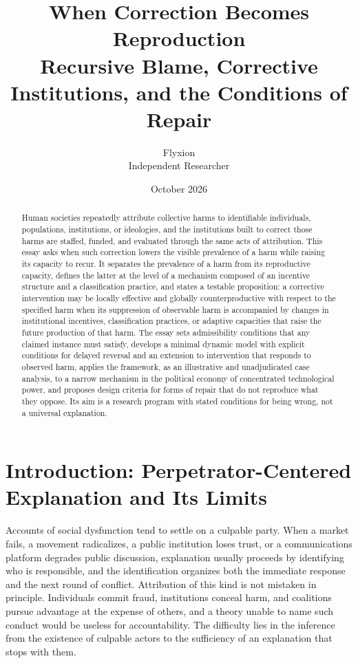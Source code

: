 \documentclass[12pt]{article}
\title{When Correction Becomes Reproduction\\[0.5ex]
\large Recursive Blame, Corrective Institutions, and the Conditions of Repair}
\author{Flyxion\\Independent Researcher}
\date{October 2026}
\theoremstyle{remark}
\begin{document}
\maketitle

\begin{abstract}
Human societies repeatedly attribute collective harms to identifiable individuals, populations, institutions, or ideologies, and the institutions built to correct those harms are staffed, funded, and evaluated through the same acts of attribution. This essay asks when such correction lowers the visible prevalence of a harm while raising its capacity to recur. It separates the prevalence of a harm from its reproductive capacity, defines the latter at the level of a mechanism composed of an incentive structure and a classification practice, and states a testable proposition: a corrective intervention may be locally effective and globally counterproductive with respect to the specified harm when its suppression of observable harm is accompanied by changes in institutional incentives, classification practices, or adaptive capacities that raise the future production of that harm. The essay sets admissibility conditions that any claimed instance must satisfy, develops a minimal dynamic model with explicit conditions for delayed reversal and an extension to intervention that responds to observed harm, applies the framework, as an illustrative and unadjudicated case analysis, to a narrow mechanism in the political economy of concentrated technological power, and proposes design criteria for forms of repair that do not reproduce what they oppose. Its aim is a research program with stated conditions for being wrong, not a universal explanation.
\end{abstract}

\section{Introduction: Perpetrator-Centered Explanation and Its Limits}
\label{sec:intro}

Accounts of social dysfunction tend to settle on a culpable party. When a market fails, a movement radicalizes, a public institution loses trust, or a communications platform degrades public discussion, explanation usually proceeds by identifying who is responsible, and the identification organizes both the immediate response and the next round of conflict. Attribution of this kind is not mistaken in principle. Individuals commit fraud, institutions conceal harm, and coalitions pursue advantage at the expense of others, and a theory unable to name such conduct would be useless for accountability. The difficulty lies in the inference from the existence of culpable actors to the sufficiency of an explanation that stops with them.
\end{document}
